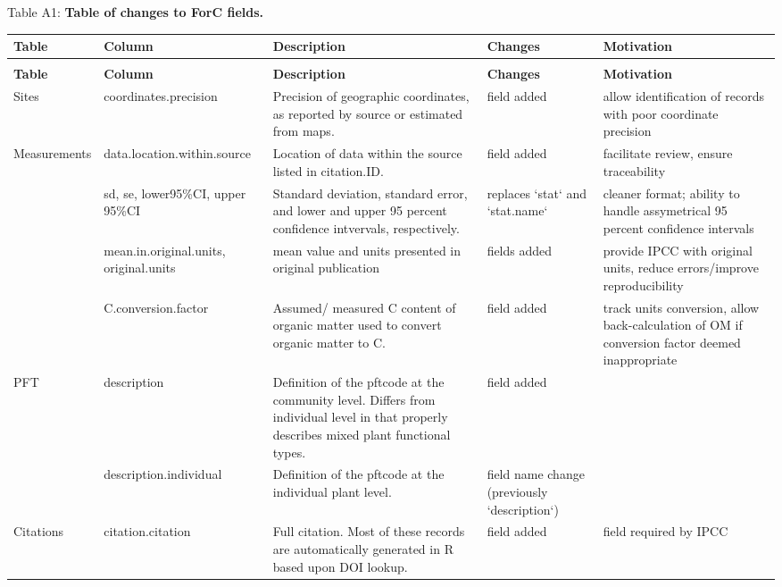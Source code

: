 \documentclass[, manuscript]{copernicus}
\begin{document}
\captionsetup[table]{labelformat=empty}

Table A1: \textbf{Table of changes to ForC fields.}
\begingroup\fontsize{8}{10}\selectfont

\begin{longtabu} to 
\hline
\textbf{Table} & \textbf{Column} & \textbf{Description} & \textbf{Changes} & \textbf{Motivation}\\
\hline
\endfirsthead
{}\\
\hline
\textbf{Table} & \textbf{Column} & \textbf{Description} & \textbf{Changes} & \textbf{Motivation}\\
\hline
\endhead
Sites & coordinates.precision & Precision of geographic coordinates, as reported by source or estimated from maps. & field added & allow identification of records with poor coordinate precision\\
\hline
Measurements & data.location.within.source & Location of data within the source listed in citation.ID. & field added & facilitate review, ensure traceability\\
\hline
 & sd, se, lower95\%CI, upper 95\%CI & Standard deviation, standard error, and lower and upper 95 percent confidence intvervals, respectively. & replaces `stat` and `stat.name` & cleaner format; ability to handle assymetrical 95 percent confidence intervals\\
\hline
 & mean.in.original.units, original.units & mean value and units presented in original publication & fields added & provide IPCC with original units, reduce errors/improve reproducibility\\
\hline
 & C.conversion.factor & Assumed/ measured C content of organic matter used to convert organic matter to C. & field added & track units conversion, allow back-calculation of OM if conversion factor deemed inappropriate\\
\hline
PFT & description & Definition of the pftcode at the community level. Differs from individual level in that properly describes mixed plant functional types. & field added & \\
\hline
 & description.individual & Definition of the pftcode at the individual plant level. & field name change (previously `description`) & \\
\hline
Citations & citation.citation & Full citation. Most of these records are automatically generated in R based upon DOI lookup. & field added & field required by IPCC\\

\end{longtabu}
\end{document}
